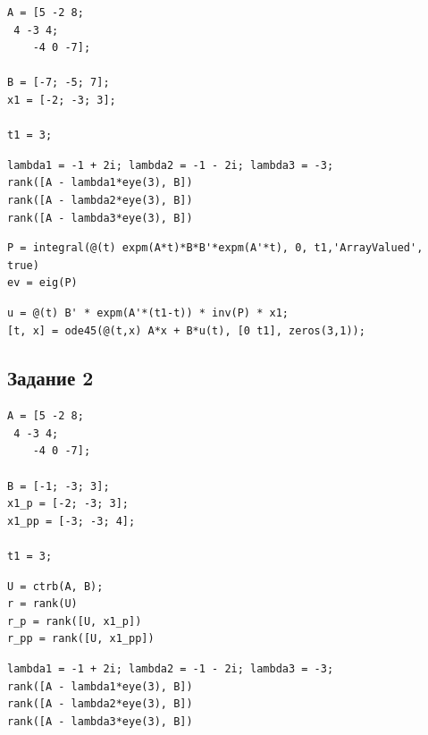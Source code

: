 \documentclass[a4paper,12pt]{article}
\begin{document}
\begin{lstlisting}[caption={Инициализация}]
A = [5 -2 8; 
 4 -3 4; 
	-4 0 -7];

B = [-7; -5; 7]; 
x1 = [-2; -3; 3];

t1 = 3;
\end{lstlisting}

	
\begin{lstlisting}[caption={Вычисление рангов матриц Хаутуса}, label={lst:haut}]
lambda1 = -1 + 2i; lambda2 = -1 - 2i; lambda3 = -3;
rank([A - lambda1*eye(3), B])
rank([A - lambda2*eye(3), B])
rank([A - lambda3*eye(3), B])
\end{lstlisting}
	
\begin{lstlisting}[caption={Грамиан управляемости}, label={lst:gram}]
P = integral(@(t) expm(A*t)*B*B'*expm(A'*t), 0, t1,'ArrayValued', true)
ev = eig(P)
\end{lstlisting}
	
\begin{lstlisting}[caption={Синтез управления}, label={lst:control}]
u = @(t) B' * expm(A'*(t1-t)) * inv(P) * x1;
[t, x] = ode45(@(t,x) A*x + B*u(t), [0 t1], zeros(3,1));
\end{lstlisting}

\newpage
\subsection*{Задание 2}

\begin{lstlisting}[caption={Инициализация}]
A = [5 -2 8; 
 4 -3 4; 
	-4 0 -7];

B = [-1; -3; 3];
x1_p = [-2; -3; 3];
x1_pp = [-3; -3; 4];

t1 = 3;
\end{lstlisting}

\begin{lstlisting}[caption={Вычисление рангов для определения принадлежности к подпространству}, label={lst:subspace}]
U = ctrb(A, B);
r = rank(U)
r_p = rank([U, x1_p])
r_pp = rank([U, x1_pp])
\end{lstlisting}

\begin{lstlisting}[caption={Вычисление рангов матриц Хаутуса}, label={lst:haut2}]
lambda1 = -1 + 2i; lambda2 = -1 - 2i; lambda3 = -3;
rank([A - lambda1*eye(3), B])
rank([A - lambda2*eye(3), B])
rank([A - lambda3*eye(3), B])
\end{lstlisting}
\end{document}
